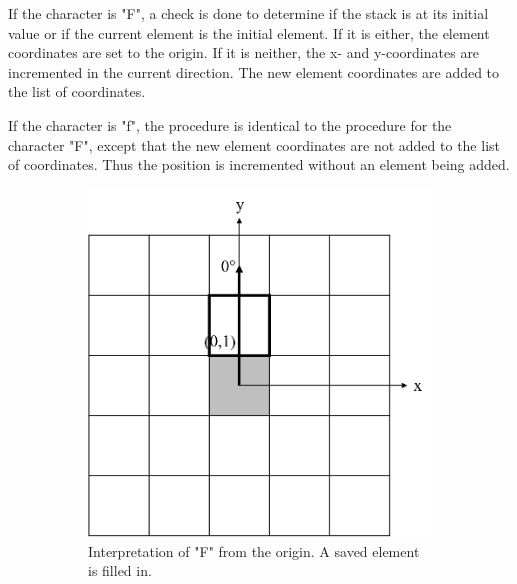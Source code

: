 If the character is "F", a check is done to determine if the stack is at its initial value or if the current element is the initial element. If it is either, the element coordinates are set to the origin. If it is neither, the x- and y-coordinates are incremented in the current direction. The new element coordinates are added to the list of coordinates.

If the character is "f", the procedure is identical to the procedure for the character "F", except that the new element coordinates are not added to the list of coordinates. Thus the position is incremented without an element being added.

\begin{figure}[H]
	\centering
	\begin{subfigure}[c]{0.4\textwidth}
		\centering
		\includegraphics[width=\textwidth]{LSF.png}
		\caption{Interpretation of "F" from the origin. A saved element is filled in.}
	\end{subfigure}
	\hfill
	\begin{subfigure}[c]{0.4\textwidth}
		\centering

\end{subfigure}
\end{figure}
